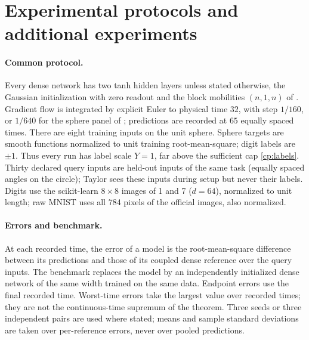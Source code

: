 \clearpage
\section{Experimental protocols and additional experiments}
\label{cp:app:experiments}

\paragraph{Common protocol.}
Every dense network has two tanh hidden layers unless stated otherwise, the
Gaussian initialization with zero readout and the block mobilities
$(n,1,n)$ of . Gradient flow is integrated by explicit Euler
to physical time $32$, with step $1/160$, or $1/640$ for the sphere panel of
; predictions are recorded at $65$ equally spaced
times. There are eight training inputs on the unit sphere. Sphere targets
are smooth functions normalized to unit training root-mean-square; digit
labels are $\pm1$. Thus every run has label scale $Y=1$, far above the
sufficient cap \eqref{cp:labels}. Thirty declared query inputs are held-out
inputs of the same task (equally spaced angles on the circle); Taylor sees
these inputs during setup but never their labels. Digits use the scikit-learn $8\times8$ images of 1 and 7
($d=64$), normalized to unit length; raw MNIST uses all 784 pixels of the
official images, also normalized.

\paragraph{Errors and benchmark.}
At each recorded time, the error of a model is the root-mean-square
difference between its predictions and those of its coupled dense
reference over the query inputs. The benchmark replaces the model by an
independently initialized dense network of the same width trained on the
same data. Endpoint errors use the final recorded time. Worst-time errors
take the largest value over recorded times; they are not the continuous-time
supremum of the theorem. Three seeds or three independent pairs are used
where stated; means and sample standard deviations are taken over
per-reference errors, never over pooled predictions.

